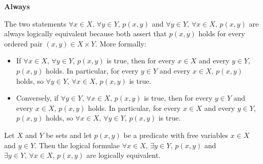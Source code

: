 \begin{mysolution}
    \textbf{Always}
    
    The two statements $\forall x \in X,\, \forall y \in Y,\, p(x,y)$ and $\forall y \in Y,\, \forall x \in X,\, p(x,y)$ are always logically equivalent because both assert that $p(x,y)$ holds for every ordered pair $(x,y)\in X \times Y$. More formally:
    \begin{itemize}
        \item If $\forall x \in X,\, \forall y \in Y,\, p(x,y)$ is true, then for every $x \in X$ and every $y \in Y$, $p(x,y)$ holds. In particular, for every $y \in Y$ and every $x \in X$, $p(x,y)$ holds, so $\forall y \in Y,\, \forall x \in X,\, p(x,y)$ is true.
        \item Conversely, if $\forall y \in Y,\, \forall x \in X,\, p(x,y)$ is true, then for every $y \in Y$ and every $x \in X$, $p(x,y)$ holds. In particular, for every $x \in X$ and every $y \in Y$, $p(x,y)$ holds, so $\forall x \in X,\, \forall y \in Y,\, p(x,y)$ is true.
    \end{itemize}
\end{mysolution}

\begin{chapex} %
Let $X$ and $Y$ be sets and let $p(x,y)$ be a predicate with free variables $x \in X$ and $y \in Y$. Then the logical formulae $\forall x \in X,\, \exists y \in Y,\, p(x,y)$ and $\exists y \in Y,\, \forall x \in X,\, p(x,y)$ are logically equivalent.
\end{chapex}

